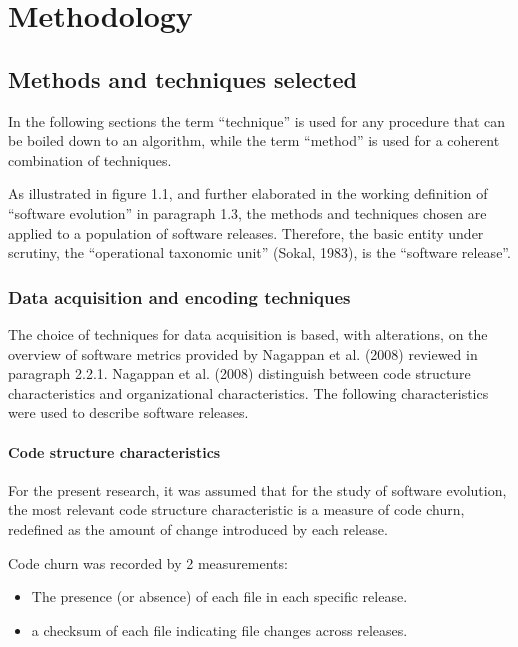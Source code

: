 
\chapter{Methodology} %

\label{Chapter3} %


\section{Methods and techniques selected}
In the following sections the term “technique” is used for any procedure that can be boiled down to an algorithm, while the term “method” is used for a coherent combination of techniques.

As illustrated in figure 1.1, and further elaborated in the working definition of “software evolution” in paragraph 1.3, the methods and techniques chosen are applied to a population of software releases. Therefore, the basic entity under scrutiny, the “operational taxonomic unit” (Sokal, 1983), is the “software release”.

\subsection{Data acquisition and encoding techniques}

The choice of techniques for data acquisition is based, with alterations, on the overview of software metrics provided by Nagappan et al. (2008) reviewed in paragraph 2.2.1. Nagappan et al. (2008) distinguish between code structure characteristics and organizational characteristics. The following characteristics were used to describe software releases.

\subsubsection{Code structure characteristics}
For the present research, it was assumed that for the study of software evolution, the most relevant code structure characteristic is a measure of code churn, redefined as the amount of change introduced by each release.

\noindent
Code churn was recorded by 2 measurements: 
\begin{itemize}
\item{The presence (or absence) of each file in each specific release.}
\item{a checksum of each file indicating file changes across releases.}
\end{itemize}

